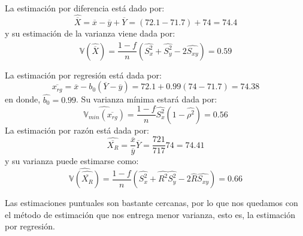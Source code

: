 \noaddpoints
{}
\begin{solution}
La estimación por diferencia está dado por: 
$$\hat{\overline{X}}=\overline{x}-\overline{y}+\overline{Y}=(72.1-71.7)+74=74.4$$
y su estimación de la varianza viene dada por:
$$\widehat{\mathbb{V}(\hat{\overline{X}})}=\dfrac{1-f}{n}(\hat{S_{x}^{2}}+\hat{S_{y}^{2}}-2\hat{S_{xy}}  )=0.59$$

La estimación por regresión está dada por:
$$\overline{x_{rg}}=\overline{x}-b_0(\overline{Y}-\overline{y})=72.1+0.99(74-71.7)=74.38$$
en donde, $\hat{b_0}=0.99$. Su varianza mínima estará dada por:
$$\widehat{\mathbb{V}_{min}(\overline{x_{rg}})}=\dfrac{1-f}{n}\hat{S_{x}^{2}}(1-\hat{\rho^2})=0.56$$
La estimación por razón está dada por:
$$\hat{\overline{X_R}}=\dfrac{\overline{x}}{\overline{y}}\overline{Y}=\dfrac{721}{717}74=74.41$$
y su varianza puede estimarse como:
$$\widehat{\mathbb{V}(\hat{\overline{X_R}})}=\dfrac{1-f}{n}(\hat{S_{x}^{2}}+\hat{R^2}\hat{S_{y}^{2}}-2\hat{R}\hat{S_{xy}}  )=0.66$$

Las estimaciones puntuales son bastante cercanas, por lo que nos quedamos con el método de estimación que nos entrega menor varianza, esto es, la estimación por regresión.

\end{solution}


